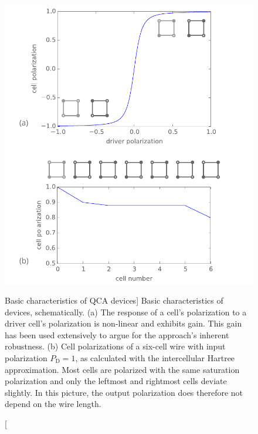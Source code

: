 \begin{figure}
  \center
  \includegraphics{qca_characterization}
  \caption
[Basic characteristics of QCA devices]
{
\label{fig:qca_characterization}
Basic characteristics of  devices, schematically. (a) The response of a
cell's polarization to a driver cell's polarization is non-linear and exhibits
gain. This gain has been used extensively to argue for the  approach's
inherent robustness. (b) Cell polarizations of a six-cell wire with input
polarization $P_\text{D} = 1$, as calculated with the intercellular Hartree
approximation. Most cells are polarized with the same saturation polarization
and only the leftmost and rightmost cells deviate slightly. In this picture, the
output polarization does therefore not depend on the wire length.
}
\end{figure}


